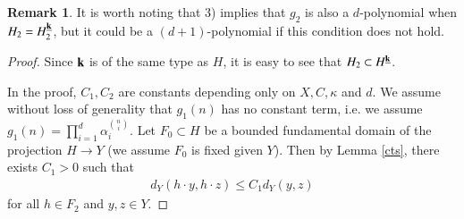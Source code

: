 \documentclass[12pt,amstex]{amsart}
\theoremstyle{definition}
\newtheorem{rem}[thm]{Remark}
\def \A {\alpha}
\def \D {\kappa}
\def \k {\bold{k}}
\begin{document}
\begin{rem}
 It is worth noting that 3) implies that $g_{2}$ is also a $d$-polynomial when $H_{2}=H_{2}^{\underline{\k}}$, but it could be a $(d+1)$-polynomial if this condition does not hold.
\end{rem}
\begin{proof} Since $\k$ is of the same type as $H$, it is easy to see that $H_{2}\subset H^{\underline{\k}}$.

In the proof, $C_{1},C_{2}$ are constants depending only on $X,C,\D$ and $d$. 
  We assume without loss of generality that $g_{1}(n)$ has no constant term, i.e. we assume $g_{1}(n)=\prod_{i=1}^{d}\A_{i}^{\binom{n}{i}}$.
  Let $F_{0}\subset H$ be a bounded fundamental domain of the projection $H\rightarrow Y$ (we assume $F_{0}$ is fixed given $Y$). Then by Lemma \ref{cts}, there exists $C_{1}>0$ such that
   \begin{equation}\nonumber
   \begin{split}
     d_{Y}(h\cdot y,h\cdot z)\leq C_{1}d_{Y}(y,z)
   \end{split}
 \end{equation}
for all $h\in F_{2}$ and $y,z\in Y$.


\end{proof}
\end{document}
